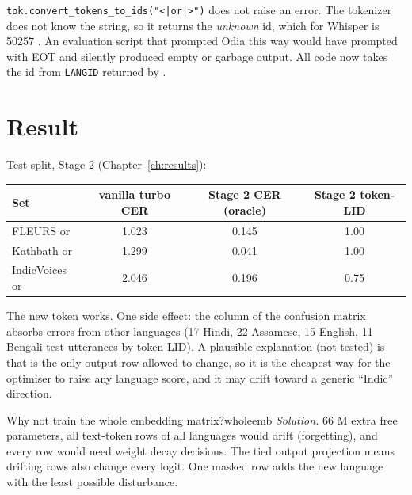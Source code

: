 \begin{vivatip}[: bug 15]
\texttt{tok.convert\_tokens\_to\_ids("<|or|>")} does not raise an error. The tokenizer does not know the string, so it returns the
\emph{unknown} id, which for Whisper is 50257 . An evaluation script that prompted Odia this way would have
prompted with EOT and silently produced empty or garbage output. All code now takes the id from \texttt{LANGID} returned by
.
\end{vivatip}

\section{Result}

Test split, Stage 2 (Chapter~\ref{ch:results}):

\begin{center}
\begin{tabular}{lccc}
\toprule
Set & vanilla turbo CER & Stage 2 CER (oracle) & Stage 2 token-LID\\
\midrule
FLEURS or & 1.023 & 0.145 & 1.00\\
Kathbath or & 1.299 & 0.041 & 1.00\\
IndicVoices or & 2.046 & 0.196 & 0.75\\
\bottomrule
\end{tabular}
\end{center}

The new token works. One side effect: the  column of the confusion matrix absorbs errors from other languages (17 Hindi,
22 Assamese, 15 English, 11 Bengali test utterances by token LID). A plausible explanation (not tested) is that  is the only
output row allowed to change, so it is the cheapest way for the optimiser to raise any language score, and it may drift toward a
generic ``Indic'' direction.

\begin{exercise}{Why not train the whole embedding matrix?}{wholeemb}
\textit{Solution.} 66 M extra free parameters, all text-token rows of all languages would drift (forgetting), and every row would
need weight decay decisions. The tied output projection means drifting rows also change every logit. One masked row adds the new
language with the least possible disturbance.
\end{exercise}
